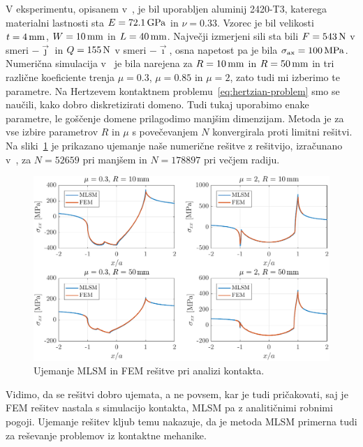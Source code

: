 \documentclass[12pt,a4paper,twoside]{article}
\theoremstyle{definition} %
\theoremstyle{plain} %
\numberwithin{equation}{section}
\newcommand{\vi}{\vec{\imath}}
\newcommand{\vj}{\vec{\jmath}}
\newcommand{\sax}{\ensuremath{\sigma_{\text{ax}}}}
\begin{document}
V eksperimentu, opisanem v~\cite{hojjati2014prediction}, je bil uporabljen aluminij 2420-T3, katerega
materialni lastnosti sta  $E = \unit[72.1]{GPa}$ in $\nu = 0.33$. Vzorec je bil velikosti $t =
\unit[4]{mm}$, $W = \unit[10]{mm}$ in $L = \unit[40]{mm}$. Največji izmerjeni sili sta bili $F =
\unit[543]{N}$ v smeri $-\vj$ in $Q = \unit[155]{N}$ v smeri $-\vi$, osna napetost pa je bila $\sax
= \unit[100]{MPa}$. Numerična simulacija v~\cite{pereira2016convergence} je bila narejena za $R =
\unit[10]{mm}$ in $R = \unit[50]{mm}$ in tri različne koeficiente trenja $\mu = 0.3$, $\mu = 0.85$
in $\mu = 2$, zato tudi mi izberimo te parametre. Na Hertzevem kontaktnem
problemu~\eqref{eq:hertzian-problem} smo se naučili, kako dobro diskretizirati domeno. Tudi tukaj
uporabimo enake parametre, le goščenje domene prilagodimo manjšim dimenzijam. Metoda je za vse
izbire parametrov $R$ in $\mu$ s povečevanjem $N$ konvergirala proti limitni rešitvi. Na
sliki~\ref{fig:fwo-ujemanje} je prikazano ujemanje naše numerične rešitve z rešitvijo, izračunano
v~\cite{pereira2016convergence}, za $N = 52659$ pri manjšem in $N = 178897$ pri večjem radiju.

\begin{figure}[h]
  \centering
  \includegraphics[width=\textwidth]{images/fwo_cases.pdf}
  \caption{Ujemanje MLSM in FEM rešitve pri analizi kontakta.}
  \label{fig:fwo-ujemanje}
\end{figure}

Vidimo, da se rešitvi dobro ujemata, a ne povsem, kar je tudi pričakovati, saj je FEM rešitev
nastala s simulacijo kontakta, MLSM pa z analitičnimi robnimi pogoji. Ujemanje rešitev kljub temu
nakazuje, da je metoda MLSM primerna tudi za reševanje problemov iz kontaktne mehanike.
\end{document}
